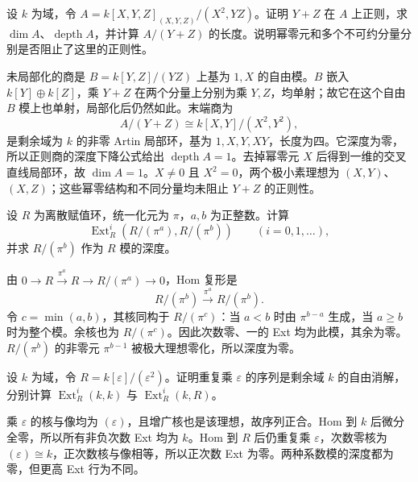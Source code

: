 \begin{exercise}\label{b3:ex:16-nonreduced-positive-depth}
	设 \(k\) 为域，令 \(A=k[X,Y,Z]_{(X,Y,Z)}/(X^2,YZ)\)。证明 \(Y+Z\) 在 \(A\) 上正则，求 \(\dim A\)、\(\operatorname{depth}A\)，并计算 \(A/(Y+Z)\) 的长度。说明幂零元和多个不可约分量分别是否阻止了这里的正则性。
\end{exercise}
\begin{solution}
	未局部化的商是 \(B=k[Y,Z]/(YZ)\) 上基为 \(1,X\) 的自由模。\(B\) 嵌入 \(k[Y]\oplus k[Z]\)，乘 \(Y+Z\) 在两个分量上分别为乘 \(Y,Z\)，均单射；故它在这个自由 \(B\) 模上也单射，局部化后仍然如此。末端商为
	\[
		A/(Y+Z)\cong k[X,Y]/(X^2,Y^2),
	\]
	是剩余域为 \(k\) 的非零 Artin 局部环，基为 \(1,X,Y,XY\)，长度为四。它深度为零，所以正则商的深度下降公式给出 \(\operatorname{depth}A=1\)。去掉幂零元 \(X\) 后得到一维的交叉直线局部环，故 \(\dim A=1\)。\(X\ne0\) 且 \(X^2=0\)，两个极小素理想为 \((X,Y)\)、\((X,Z)\)；这些幂零结构和不同分量均未阻止 \(Y+Z\) 的正则性。
\end{solution}

\begin{exercise}\label{b3:ex:16-dvr-ext}
	设 \(R\) 为离散赋值环，统一化元为 \(\pi\)，\(a,b\) 为正整数。计算
	\[
		\operatorname{Ext}_R^i(R/(\pi^a),R/(\pi^b))\qquad(i=0,1,\ldots),
	\]
	并求 \(R/(\pi^b)\) 作为 \(R\) 模的深度。
\end{exercise}
\begin{solution}
	由 \(0\rightarrow R\xrightarrow{\pi^a}R\rightarrow R/(\pi^a)\rightarrow0\)，Hom 复形是
	\[
		R/(\pi^b)\xrightarrow{\pi^a}R/(\pi^b).
	\]
	令 \(c=\min(a,b)\)，其核同构于 \(R/(\pi^c)\)：当 \(a<b\) 时由 \(\pi^{b-a}\) 生成，当 \(a\ge b\) 时为整个模。余核也为 \(R/(\pi^c)\)。因此次数零、一的 Ext 均为此模，其余为零。\(R/(\pi^b)\) 的非零元 \(\pi^{b-1}\) 被极大理想零化，所以深度为零。
\end{solution}

\begin{exercise}\label{b3:ex:16-periodic-ext}
	设 \(k\) 为域，令 \(R=k[\varepsilon]/(\varepsilon^2)\)。证明重复乘 \(\varepsilon\) 的序列是剩余域 \(k\) 的自由消解，分别计算 \(\operatorname{Ext}_R^i(k,k)\) 与 \(\operatorname{Ext}_R^i(k,R)\)。
\end{exercise}
\begin{solution}
	乘 \(\varepsilon\) 的核与像均为 \((\varepsilon)\)，且增广核也是该理想，故序列正合。Hom 到 \(k\) 后微分全零，所以所有非负次数 Ext 均为 \(k\)。Hom 到 \(R\) 后仍重复乘 \(\varepsilon\)，次数零核为 \((\varepsilon)\cong k\)，正次数核与像相等，所以正次数 Ext 为零。两种系数模的深度都为零，但更高 Ext 行为不同。
\end{solution}

